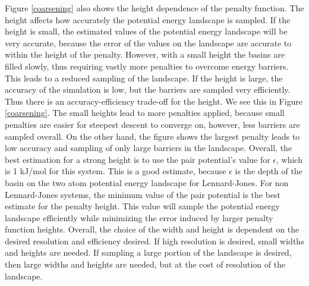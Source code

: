 Figure \ref{coarsening} also shows the height dependence of the penalty function.  The height affects how accurately the potential energy landscape is sampled.  If the height is small, the estimated values of the potential energy landscape will be very accurate, because the error of the values on the landscape are accurate to within the height of the penalty.  However, with a small height the basins are filled slowly, thus requiring vastly more penalties to overcome energy barriers.  This leads to a reduced sampling of the landscape.  If the height is large, the accuracy of the simulation is low, but the barriers are sampled very efficiently.  Thus there is an accuracy-efficiency trade-off for the height.  We see this in Figure \ref{coarsening}.  The small heights lead to more penalties applied, because small penalties are easier for steepest descent to converge on, however, less barriers are sampled overall.  On the other hand, the figure shows the largest penalty leads to low accuracy and sampling of only large barriers in the landscape.  Overall, the best estimation for a strong height is to use the pair potential's value for $\epsilon$, which is 1 kJ/mol for this system.  This is a good estimate, because $\epsilon$ is the depth of the basin on the two atom potential energy landscape for Lennard-Jones.  For non Lennard-Jones systems, the minimum value of the pair potential is the best estimate for the penalty height.  This value will sample the potential energy landscape efficiently while minimizing the error induced by larger penalty function heights.  Overall, the choice of the width and height is dependent on the desired resolution and efficiency desired.  If high resolution is desired, small widths and heights are needed.  If sampling a large portion of the landscape is desired, then large widths and heights are needed, but at the cost of resolution of the landscape.

